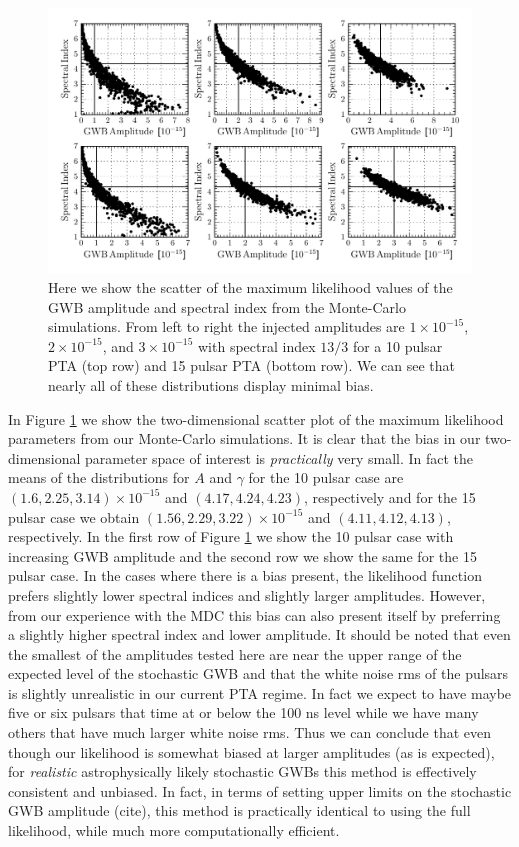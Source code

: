 \documentclass[iop]{emulateapj}
\begin{document}
\begin{figure}[!t]
  \begin{center}
	\includegraphics[scale=1.0]{EDF_scatter.pdf}
  \end{center}
  \caption{Here we show the scatter of the maximum likelihood values of the GWB amplitude and spectral index from the Monte-Carlo simulations. From left to right the injected amplitudes are $1\times 10^{-15}$, $2\times 10^{-15}$, and $3\times 10^{-15}$ with spectral index $13/3$ for a 10 pulsar PTA (top row) and 15 pulsar PTA (bottom row). We can see that nearly all of these distributions display minimal bias. }
\label{fig:edf_scatter}
\end{figure}
In Figure \ref{fig:edf_scatter} we show the two-dimensional scatter plot of the maximum likelihood parameters from our Monte-Carlo simulations. It is clear that the bias in our two-dimensional parameter space of interest is \emph{practically} very small. In fact the means of the distributions for $A$ and $\gamma$ for the 10 pulsar case are $(1.6,2.25,3.14)\times 10^{-15}$ and $(4.17,4.24,4.23)$, respectively and for the 15 pulsar case we obtain $(1.56,2.29,3.22)\times 10^{-15}$ and $(4.11,4.12,4.13)$, respectively. In the first row of Figure \ref{fig:edf_scatter} we show the 10 pulsar case with increasing GWB amplitude and the second row we show the same for the 15 pulsar case. In the cases where there is a bias present, the likelihood function prefers slightly lower spectral indices and slightly larger amplitudes. However, from our experience with the MDC this bias can also present itself by preferring a slightly higher spectral index and lower amplitude.   It should  be noted that even the smallest of the amplitudes tested here are near the upper range of  the expected level of the stochastic GWB \citep{s13} and that the white noise rms of the pulsars is slightly unrealistic in our current PTA regime. In fact we expect to have maybe five or six pulsars that time at or below the 100 ns level while we have many others that have much larger white noise rms. Thus we can conclude that even though our likelihood is somewhat biased at larger amplitudes (as is expected), for \emph{realistic} astrophysically likely stochastic GWBs this method is effectively consistent and unbiased. In fact, in terms of setting upper limits on the stochastic GWB amplitude (cite), this method is practically identical to using the full likelihood, while much more computationally efficient.
\end{document}
